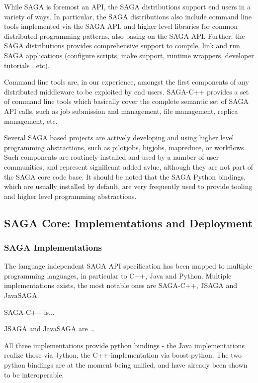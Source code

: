 \documentclass[12pt]{article}
\begin{document}
  While SAGA is foremost an API, the SAGA distributions support end
  users in a variety of ways.  In particular, the SAGA distributions
  also include command line tools implemented via the SAGA API, and
  higher level libraries for common distributed programming patterns,
  also basing on the SAGA API.  Further, the SAGA distributions
  provides comprehensive support to compile, link and run SAGA
  applications (configure scripts, make support, runtime wrappers,
  developer tutorials , etc).

  Command line tools are, in our experience, amongst the first
  components of any distributed middleware to be exploited by end
  users.  SAGA-C++ provides a set of command line tools which
  basically cover the complete semantic set of SAGA API calls, such as
  job submission and management, file management, replica management,
  etc.

  Several SAGA based projects are actively developing and using higher
  level programming abstractions, such as pilotjobs, bigjobs,
  mapreduce, or workflows.  Such components are routinely installed
  and used by a number of user communities, and represent significant
  added avlue, although they are not part of the SAGA core code base.
  It should be noted that the SAGA Python bindings, which are usually
  installed by default, are very frequently used to provide tooling and
  higher level programming abstractions.


 \subsection{SAGA Core: Implementations and Deployment}

  \subsubsection{SAGA Implementations}

   The language independent SAGA API specification has been mapped to
   multiple programming languages, in particular to C++, Java and
   Python.  Multiple implementations exists, the most notable ones are
   SAGA-C++, JSAGA and JavaSAGA.

   SAGA-C++ is...

   JSAGA and JavaSAGA are …

   All three implementations provide python bindings - the Java
   implementations realize those via Jython, the C++-implementation
   via boost-python.  The two python bindings are at the moment being
   unified, and have already been shown to be interoperable.
\end{document}
